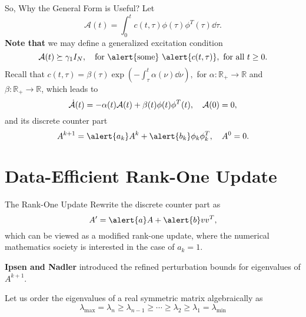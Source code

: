 \documentclass[]{beamer}
\theoremstyle{plain}
\theoremstyle{definition}
\theoremstyle{remark}
\newcommand{\MC}[1]{\mathcal{#1}}
\newcommand{\MB}[1]{\mathbb{#1}}
\begin{document}
\begin{frame}{So, Why the General Form is Useful?}
	Let
	\begin{equation*}
		\MC{A}(t) = \int_0^t c(t, \tau) \phi(\tau) \phi^T(\tau) \dd{\tau}.
	\end{equation*}
	\textbf{Note that} we may define a \alert{generalized} excitation condition
	\begin{equation*}
		\MC{A}(t) \succeq \gamma_1 I_N \qc \text{for \alert{some} } \alert{c(t,
		\tau)},\ \text{for all } t \ge 0.
	\end{equation*}
	\pause
	Recall that
	$ c(t, \tau) = \beta(\tau) \exp(- \int_\tau^t \alpha(\nu) \dd{\nu}), $
	for $\alpha: \MB{R}_{+} \to \MB{R}$ and $\beta: \MB{R}_{+} \to \MB{R}$,
	which leads to 
	\begin{equation*}
		\dot{\MC{A}}(t) = - \alpha(t) \MC{A}(t) + \beta(t) \phi(t) \phi^T(t) \qc
		\MC{A}(0) = 0,
	\end{equation*}
	and its discrete counter part
	\begin{equation*}
		A^{k+1} = \alert{a_k} A^k + \alert{b_k} \phi_k \phi_k^T \qc A^0 = 0.
	\end{equation*}
\end{frame}


\section{Data-Efficient Rank-One Update}

\begin{frame}{The Rank-One Update}
	Rewrite the discrete counter part as
	\begin{equation*}
		A^\prime = \alert{a} A + \alert{b} v v^T,
	\end{equation*}
	which can be viewed as a modified rank-one
	update, where the numerical mathematics
	society is interested in the case of $a_k = 1$.
	\pause

	\vspace{1em}
	\textbf{Ipsen and Nadler} introduced the
	refined perturbation bounds for eigenvalues of $A^{k+1}$.

	\vspace{1em}
	Let us order the eigenvalues of a real symmetric matrix algebraically as
	\begin{equation*}
		\lambda_{\max} = \lambda_n \ge \lambda_{n-1} \ge \cdots \ge \lambda_2 \ge
		\lambda_1 = \lambda_{\min}
	\end{equation*}
\end{frame}
\end{document}

